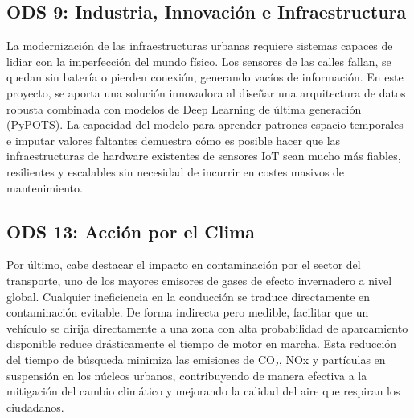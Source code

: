 \subsection{ODS 9: Industria, Innovación e Infraestructura}
\label{sec:obj_ds}
La modernización de las infraestructuras urbanas requiere sistemas capaces de lidiar con la imperfección del mundo físico. Los sensores de las calles fallan, se quedan sin batería o pierden conexión, generando vacíos de información. En este proyecto, se aporta una solución innovadora al diseñar una arquitectura de datos robusta combinada con modelos de Deep Learning de última generación (PyPOTS). La capacidad del modelo para aprender patrones espacio-temporales e imputar valores faltantes demuestra cómo es posible hacer que las infraestructuras de hardware existentes de sensores IoT sean mucho más fiables, resilientes y escalables sin necesidad de incurrir en costes masivos de mantenimiento.

\subsection{ODS 13: Acción por el Clima}
\label{sec:obj_ds}
Por último, cabe destacar el impacto en contaminación por el sector del transporte, uno de los mayores emisores de gases de efecto invernadero a nivel global. Cualquier ineficiencia en la conducción se traduce directamente en contaminación evitable. De forma indirecta pero medible, facilitar que un vehículo se dirija directamente a una zona con alta probabilidad de aparcamiento disponible reduce drásticamente el tiempo de motor en marcha. Esta reducción del tiempo de búsqueda minimiza las emisiones de CO₂, NOx y partículas en suspensión en los núcleos urbanos, contribuyendo de manera efectiva a la mitigación del cambio climático y mejorando la calidad del aire que respiran los ciudadanos.